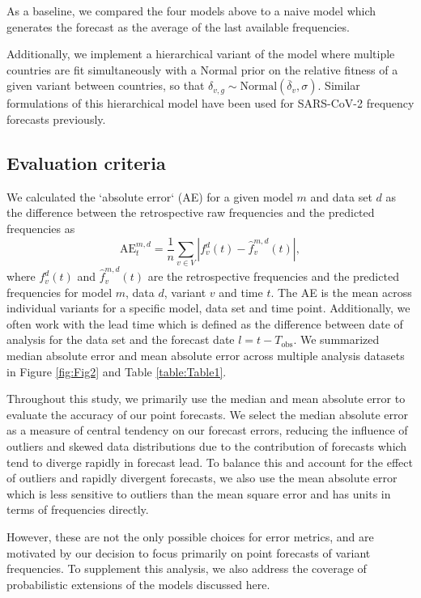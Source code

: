 \documentclass[10pt,letterpaper]{article}
\begin{document}
As a baseline, we compared the four models above to a naive model which generates the forecast as the average of the last available frequencies.

Additionally, we implement a hierarchical variant of the model where multiple countries are fit simultaneously with a Normal prior on the relative fitness of a given variant between countries, so that $\delta_{v, g} \sim \text{Normal}(\overline{\delta}_{v}, \sigma)$.
Similar formulations of this hierarchical model have been used for SARS-CoV-2 frequency forecasts previously. \cite{susswein2023leveraging}

\subsection*{Evaluation criteria}

We calculated the `absolute error` (AE) for a given model $m$ and data set $d$ as the difference between the retrospective raw frequencies and the predicted frequencies as
\begin{equation}
    \mathrm{AE}_{t}^{m,d} = \frac{1}{n} \sum_{v \in V} \left|f_{v}^{d}(t) - \hat{f}^{m,d}_{v}(t) \right|,
\end{equation}
where $f_{v}^{d}(t)$ and $\hat{f}_{v}^{m,d}(t)$ are the retrospective frequencies and the predicted frequencies for model $m$, data $d$, variant $v$ and time $t$.
The AE is the mean across individual variants for a specific model, data set and time point.
Additionally, we often work with the lead time which is defined as the difference between date of analysis for the data set and the forecast date $l = t - T_{\text{obs}}$.
We summarized median absolute error and mean absolute error across multiple analysis datasets in Figure \ref{fig:Fig2} and Table \ref{table:Table1}.

Throughout this study, we primarily use the median and mean absolute error to evaluate the accuracy of our point forecasts.
We select the median absolute error as a measure of central tendency on our forecast errors, reducing the influence of outliers and skewed data distributions due to the contribution of forecasts which tend to diverge rapidly in forecast lead.
To balance this and account for the effect of outliers and rapidly divergent forecasts, we also use the mean absolute error which is less sensitive to outliers than the mean square error and has units in terms of frequencies directly.

However, these are not the only possible choices for error metrics, and are motivated by our decision to focus primarily on point forecasts of variant frequencies.
To supplement this analysis, we also address the coverage of probabilistic extensions of the models discussed here.
\end{document}
